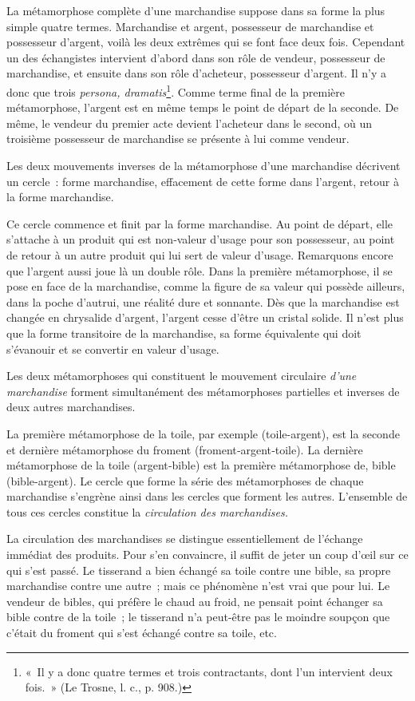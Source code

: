 \documentclass[french,twoside]{book} %
\begin{document}
La métamorphose complète d’une marchandise suppose dans sa forme la plus simple quatre termes. Marchandise et argent, possesseur de marchandise et possesseur d’argent, voilà les deux extrêmes qui se font face deux fois. Cependant un des échangistes intervient d’abord dans son rôle de vendeur, possesseur de marchandise, et ensuite dans son rôle d’acheteur, possesseur d’argent. Il n’y a donc que trois \emph{persona, dramatis}\footnote{« Il y a donc quatre termes et trois contractants, dont l’un intervient deux fois. » (Le Trosne, l. c., p. 908.)}. Comme terme final de la première métamorphose, l’argent est en même temps le point de départ de la seconde. De même, le vendeur du premier acte devient l’acheteur dans le second, où un troisième possesseur de marchandise se présente à lui comme vendeur.\par
Les deux mouvements inverses de la métamorphose d’une marchandise décrivent un cercle : forme marchandise, effacement de cette forme dans l’argent, retour à la forme marchandise.\par
Ce cercle commence et finit par la forme marchandise. Au point de départ, elle s’attache à un produit qui est non‑valeur d’usage pour son possesseur, au point de retour à un autre produit qui lui sert de valeur d’usage. Remarquons encore que l’argent aussi joue là un double rôle. Dans la première métamorphose, il se pose en face de la marchandise, comme la figure de sa valeur qui possède ailleurs, dans la poche d’autrui, une réalité dure et sonnante. Dès que la marchandise est changée en chrysalide d’argent, l’argent cesse d’être un cristal solide. Il n’est plus que la forme transitoire de la marchandise, sa forme équivalente qui doit s’évanouir et se convertir en valeur d’usage.\par
Les deux métamorphoses qui constituent le mouvement circulaire \emph{d’une marchandise} forment simultanément des métamorphoses partielles et inverses de deux autres marchandises.\par
La première métamorphose de la toile, par exemple (toile-argent), est la seconde et dernière métamorphose du froment (froment‑argent‑toile). La dernière métamorphose de la toile (argent‑bible) est la première métamorphose de, bible (bible-argent). Le cercle que forme la série des métamorphoses de chaque marchandise s’engrène ainsi dans les cercles que forment les autres. L’ensemble de tous ces cercles constitue la \emph{circulation des marchandises.}\par
La circulation des marchandises se distingue essentiellement de l’échange immédiat des produits. Pour s’en convaincre, il suffit de jeter un coup d’œil sur ce qui s’est passé. Le tisserand a bien échangé sa toile contre une bible, sa propre marchandise contre une autre ; mais ce phénomène n’est vrai que pour lui. Le vendeur de bibles, qui préfère le chaud au froid, ne pensait point échanger sa bible contre de la toile ; le tisserand n’a peut-être pas le moindre soupçon que c’était du froment qui s’est échangé contre sa toile, etc.\par
\end{document}
